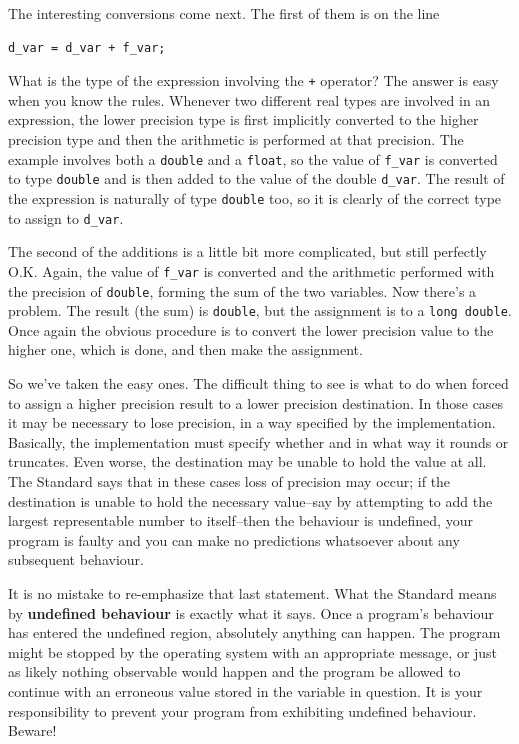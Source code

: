   The interesting conversions come next. The first of them is on the
   line


  \begin{Verbatim}
d_var = d_var + f_var;
\end{Verbatim}

  What is the type of the expression involving the \texttt{+} operator?
   The answer is easy when you know the rules. Whenever two different real
   types are involved in an expression, the lower precision type is first
   implicitly converted to the higher precision type and then the arithmetic
   is performed at that precision. The example involves both a
   \texttt{double} and a \texttt{float}, so the value of
   \texttt{f\_var} is converted to type \texttt{double} and is then
   added to the value of the double \texttt{d\_var}. The result of the
   expression is naturally of type \texttt{double} too, so it is clearly
   of the correct type to assign to \texttt{d\_var}.


  The second of the additions is a little bit more complicated, but still
   perfectly O.K. Again, the value of \texttt{f\_var} is converted and the
   arithmetic performed with the precision of \texttt{double}, forming the
   sum of the two variables. Now there's a problem. The result (the sum) is
   \texttt{double}, but the assignment is to a \texttt{long double}.
   Once again the obvious procedure is to convert the lower precision value to
   the higher one, which is done, and then make the assignment.


  So we've taken the easy ones. The difficult thing to see is what to do
   when forced to assign a higher precision result to a lower precision
   destination. In those cases it may be necessary to lose precision, in a way
   specified by the implementation. Basically, the implementation must specify
   whether and in what way it rounds or truncates. Even worse, the destination
   may be unable to hold the value at all. The Standard says that in these
   cases loss of precision may occur; if the destination is unable to hold the
   necessary value--say by attempting to add the largest representable
   number to itself--then the behaviour is undefined, your program is
   faulty and you can make no predictions whatsoever about any subsequent
   behaviour.


  It is no mistake to re-emphasize that last statement. What the Standard
   means by \textbf{undefined behaviour} is exactly what it says. Once a
   program's behaviour has entered the undefined region, absolutely anything
   can happen. The program might be stopped by the operating system with an
   appropriate message, or just as likely nothing observable would happen and
   the program be allowed to continue with an erroneous value stored in the
   variable in question. It is your responsibility to prevent your program
   from exhibiting undefined behaviour. Beware!


